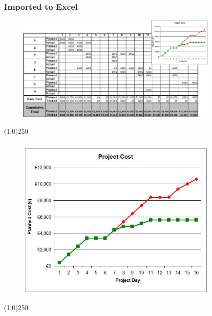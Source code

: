\begin{frame}
\frametitle{Imported to Excel}
\begin{figure}
	\centering
		\includegraphics[width = 10cm]{images/costover.jpg}
	\label{fig:costover}
\end{figure}

\end{frame}
\begin{center}\line(1,0){250}\end{center}






\begin{frame}
\frametitle{}
\begin{figure}
	\centering
		\includegraphics[width = 10cm]{images/costoverlg.jpg}
	\label{fig:costoverlg}
\end{figure}
\end{frame}
\begin{center}\line(1,0){250}\end{center}







